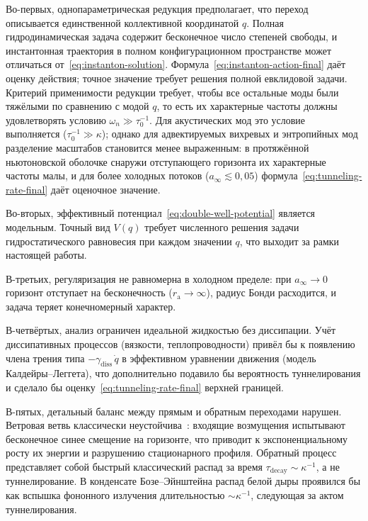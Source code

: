 \documentclass[12pt,a4paper,preprint]{elsarticle}
\begin{document}
            Во-первых, однопараметрическая редукция предполагает, что переход описывается единственной коллективной координатой $q$. Полная гидродинамическая задача содержит бесконечное число степеней свободы, и инстантонная траектория в полном конфигурационном пространстве может отличаться от~\eqref{eq:instanton-solution}. Формула~\eqref{eq:instanton-action-final} даёт оценку действия; точное значение требует решения полной евклидовой задачи. Критерий применимости редукции требует, чтобы все остальные моды были тяжёлыми по сравнению с модой $q$, то есть их характерные частоты должны удовлетворять условию $\omega_{n} \gg \tau_{0}^{-1}$. Для акустических мод это условие выполняется ($\tau_{0}^{-1} \gg \kappa$); однако для адвектируемых вихревых и энтропийных мод разделение масштабов становится менее выраженным: в протяжённой ньютоновской оболочке снаружи отступающего горизонта их характерные частоты малы, и для более холодных потоков ($a_{\infty} \lesssim 0{,}05$) формула~\eqref{eq:tunneling-rate-final} даёт оценочное значение.
            
            Во-вторых, эффективный потенциал~\eqref{eq:double-well-potential} является модельным. Точный вид $V(q)$ требует численного решения задачи гидростатического равновесия при каждом значении $q$, что выходит за рамки настоящей работы.
            
            В-третьих, регуляризация не равномерна в холодном пределе: при $a_{\infty} \to 0$ горизонт отступает на бесконечность ($r_{\mathrm{a}} \to \infty$), радиус Бонди расходится, и задача теряет конечномерный характер.
            
            В-четвёртых, анализ ограничен идеальной жидкостью без диссипации. Учёт диссипативных процессов (вязкости, теплопроводности) привёл бы к появлению члена трения типа $-\gamma_{\mathrm{diss}}\,\dot{q}$ в эффективном уравнении движения (модель Калдейры--Леггета), что дополнительно подавило бы вероятность туннелирования и сделало бы оценку~\eqref{eq:tunneling-rate-final} верхней границей.
            
            В-пятых, детальный баланс между прямым и обратным переходами нарушен. Ветровая ветвь классически неустойчива~\cite{SemyannikovAV_GlobalAcousticGeometryOfMichelFlowInPainleveGullstrandCoordinates_2026}: входящие возмущения испытывают бесконечное синее смещение на горизонте, что приводит к экспоненциальному росту их энергии и разрушению стационарного профиля. Обратный процесс представляет собой быстрый классический распад за время $\tau_{\mathrm{decay}} \sim \kappa^{-1}$, а не туннелирование. В конденсате Бозе--Эйнштейна распад белой дыры проявился бы как вспышка фононного излучения длительностью $\sim\kappa^{-1}$, следующая за актом туннелирования.
\end{document}
